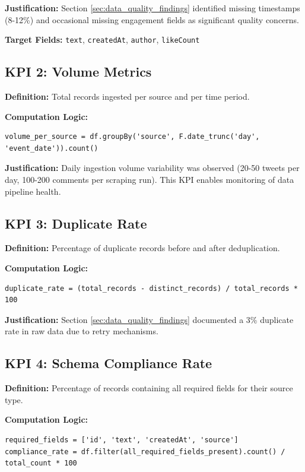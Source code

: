 \documentclass[12pt]{article}
\begin{document}
\textbf{Justification:} Section \ref{sec:data_quality_findings} identified missing timestamps (8-12\%) and occasional missing engagement fields as significant quality concerns.

\textbf{Target Fields:} \texttt{text}, \texttt{createdAt}, \texttt{author}, \texttt{likeCount}

\subsection{KPI 2: Volume Metrics}

\textbf{Definition:} Total records ingested per source and per time period.

\textbf{Computation Logic:}
\begin{lstlisting}
volume_per_source = df.groupBy('source', F.date_trunc('day', 'event_date')).count()
\end{lstlisting}

\textbf{Justification:} Daily ingestion volume variability was observed (20-50 tweets per day, 100-200 comments per scraping run). This KPI enables monitoring of data pipeline health.

\subsection{KPI 3: Duplicate Rate}

\textbf{Definition:} Percentage of duplicate records before and after deduplication.

\textbf{Computation Logic:}
\begin{lstlisting}
duplicate_rate = (total_records - distinct_records) / total_records * 100
\end{lstlisting}

\textbf{Justification:} Section \ref{sec:data_quality_findings} documented a 3\% duplicate rate in raw data due to retry mechanisms.

\subsection{KPI 4: Schema Compliance Rate}

\textbf{Definition:} Percentage of records containing all required fields for their source type.

\textbf{Computation Logic:}
\begin{lstlisting}
required_fields = ['id', 'text', 'createdAt', 'source']
compliance_rate = df.filter(all_required_fields_present).count() / total_count * 100
\end{lstlisting}
\end{document}
